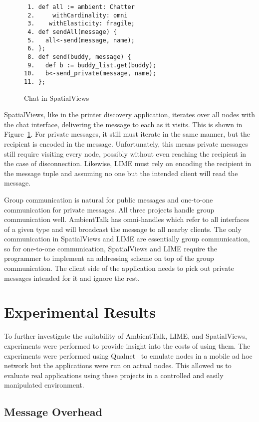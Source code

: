 \documentclass{sig-alternate}
\begin{document}
\begin{figure}
\centering
\begin{verbatim}
 1. def all := ambient: Chatter 
 2.     withCardinality: omni 
 3.    withElasticity: fragile;
 4. def sendAll(message) {
 5.   all<-send(message, name);
 6. };
 8. def send(buddy, message) {
 9.   def b := buddy_list.get(buddy);
10.   b<-send_private(message, name);
11. };
\end{verbatim}
\caption{Chat in SpatialViews}
\label{fig:svchat}
\end{figure}

SpatialViews, like in the printer discovery application, iterates over all nodes with the chat interface, delivering the message to each as it visits. This is shown in Figure~\ref{fig:svchat}. For private messages, it still must iterate in the same manner, but the recipient is encoded in the message. Unfortunately, this means private messages still require visiting every node, possibly without even reaching the recipient in the case of disconnection. Likewise, LIME must rely on encoding the recipient in the message tuple and assuming no one but the intended client will read the message.

Group communication is natural for public messages and one-to-one communication for private messages. All three projects handle group communication well. AmbientTalk has omni-handles which refer to all interfaces of a given type and will broadcast the message to all nearby clients. The only communication in SpatialViews and LIME are essentially group communication, so for one-to-one communication, SpatialViews and LIME require the programmer to implement an addressing scheme on top of the group communication. The client side of the application needs to pick out private messages intended for it and ignore the rest.

\section{Experimental Results}

To further investigate the suitability of AmbientTalk, LIME, and SpatialViews, experiments were performed to provide insight into the costs of using them. The experiments were performed using Qualnet~\cite{qualnet} to emulate nodes in a mobile ad hoc network but the applications were run on actual nodes. This allowed us to evaluate real applications using these projects in a controlled and easily manipulated environment.

\subsection{Message Overhead}
\end{document}
